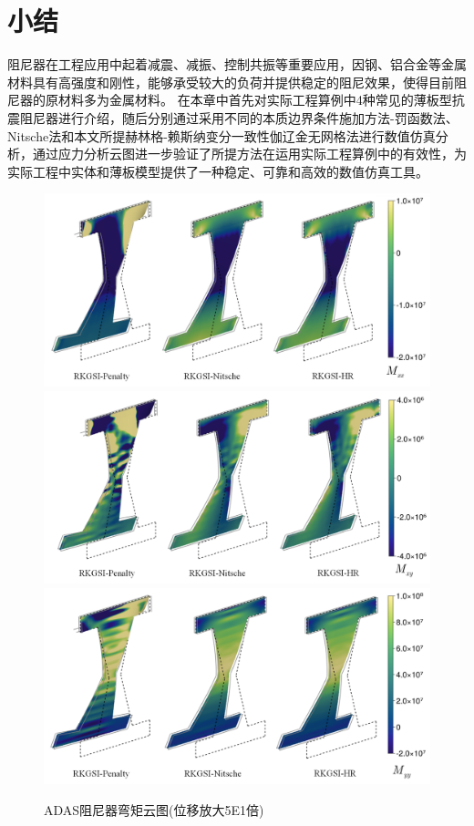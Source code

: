 \section{小结}
阻尼器在工程应用中起着减震、减振、控制共振等重要应用，因钢、铝合金等金属材料具有高强度和刚性，能够承受较大的负荷并提供稳定的阻尼效果，使得目前阻尼器的原材料多为金属材料。
在本章中首先对实际工程算例中4种常见的薄板型抗震阻尼器进行介绍，随后分别通过采用不同的本质边界条件施加方法-罚函数法、Nitsche法和本文所提赫林格-赖斯纳变分一致性伽辽金无网格法进行数值仿真分析，通过应力分析云图进一步验证了所提方法在运用实际工程算例中的有效性，为实际工程中实体和薄板模型提供了一种稳定、可靠和高效的数值仿真工具。
\begin{figure}[H]
    \centering
        \includegraphics[scale=0.5]{figure/DAMPER/ADAS/M11.png}
        \includegraphics[scale=0.5]{figure/DAMPER/ADAS/M12.png}
        \includegraphics[scale=0.5]{figure/DAMPER/ADAS/M22.png}
    \caption{ADAS阻尼器弯矩云图(位移放大5E1倍)}\label{ADASM}
\end{figure}
